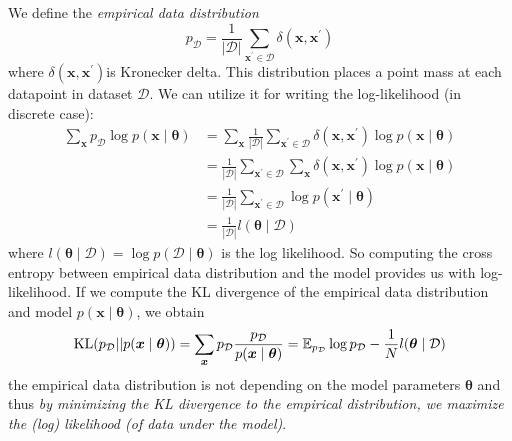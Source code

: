 We define the \textit{empirical data distribution}
$$
p_{\mathcal{D}} = \frac{1}{|\mathcal{D}|} \sum_{\boldsymbol{x}^\prime \in \mathcal{D}} \delta(\boldsymbol{x},\boldsymbol{x}^\prime)
$$
where $\delta(\boldsymbol{x},\boldsymbol{x}^\prime)$is Kronecker delta.  This distribution places a point mass at each datapoint in dataset $\mathcal{D}$.
We can utilize it for writing the log-likelihood (in discrete case):
\begin{align*}
\sum_{\boldsymbol{x}} p_{\mathcal{D}} \log p(\boldsymbol{x} \mid \boldsymbol{\theta}) &= \sum_{\boldsymbol{x}} \frac{1}{|\mathcal{D}|} \sum_{\boldsymbol{x}^\prime \in \mathcal{D}} \delta(\boldsymbol{x},\boldsymbol{x}^\prime) \log  p(\boldsymbol{x} \mid \boldsymbol{\theta}) \\
    &= \frac{1}{|\mathcal{D}|} \sum_{\boldsymbol{x}^\prime \in \mathcal{D}} \sum_{\boldsymbol{x}} \delta(\boldsymbol{x},\boldsymbol{x}^\prime) \log  p(\boldsymbol{x} \mid \boldsymbol{\theta})\\
    &= \frac{1}{|\mathcal{D}|} \sum_{\boldsymbol{x}^\prime \in \mathcal{D}} \log  p(\boldsymbol{x}^\prime \mid \boldsymbol{\theta}) \\
    &= \frac{1}{|\mathcal{D}|} l(\boldsymbol{\theta} \mid \mathcal{D})
\end{align*}
where $l(\boldsymbol{\theta} \mid \mathcal{D}) = \log p(\mathcal{D} \mid \boldsymbol{\theta})$ is the log likelihood. So computing the cross entropy between empirical data distribution and the model provides us with log-likelihood.
If we compute the KL divergence of the empirical data distribution and model $p(\boldsymbol{x} \mid \boldsymbol{\theta})$, we obtain
$$
\mathrm{KL}(p_{\mathcal{D}} || p(\boldsymbol{x} \mid \boldsymbol{\theta})) = \sum_{\boldsymbol{x}} p_{\mathcal{D}} \frac{p_{\mathcal{D}}}{p(\boldsymbol{x} \mid \boldsymbol{\theta})} = \operatorname{\mathbb{E}}_{p_{\mathcal{D}}} \log p_{\mathcal{D}} - \frac{1}{N} l(\boldsymbol{\theta} \mid \mathcal{D})
$$ 
the empirical data distribution is not depending on the model parameters $\boldsymbol{\theta}$ and thus \textit{by minimizing the KL divergence to the empirical distribution, we maximize the (log) likelihood (of data under the model)}. 